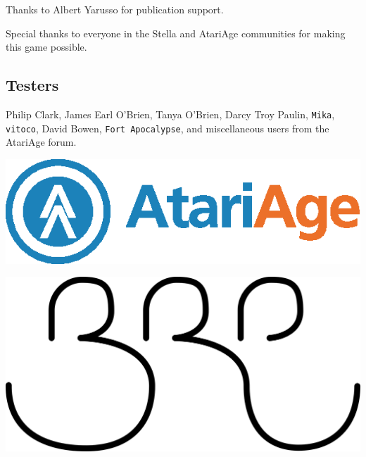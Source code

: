 \documentclass[10pt,twocolumn,openany,article]{memoir}
\begin{document}
Thanks to Albert Yarusso for publication support.

Special thanks  to everyone in  the Stella and AtariAge  communities for
making this game possible.

\vspace{30pt}

\subsection{Testers}

Philip Clark,
James Earl O'Brien,
Tanya O'Brien,
Darcy Troy Paulin,
\texttt{Mika},
\texttt{vitoco},
David Bowen,
\texttt{Fort Apocalypse},
and miscellaneous users from the AtariAge forum.

\vfill

\begin{center}
  \ifdefined\ATARIAGESAVE
  \includegraphics[width=.6667\columnwidth]{../Manual/AtariAgeHorizontalColor.eps}
  \vspace{14pt}
  \fi

  \includegraphics[width=.333\columnwidth]{../Manual/BRP.png}
\end{center}

\clearpage
{}
\thispagestyle{empty}

\ifdefined\ATARIAGESAVE
{}
\else
{}
\fi
\end{document}
